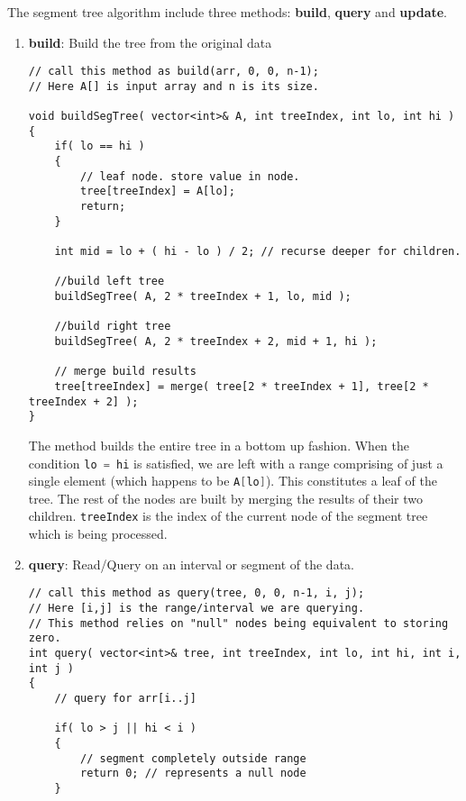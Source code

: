 The segment tree algorithm include three methods: \textbf{build}, \textbf{query} and \textbf{update}.

\begin{enumerate}
\item \textbf{build}: Build the tree from the original data
\setcounter{lstlisting}{0}
\begin{lstlisting}[style=customc, caption={Build}]
// call this method as build(arr, 0, 0, n-1);
// Here A[] is input array and n is its size.

void buildSegTree( vector<int>& A, int treeIndex, int lo, int hi )
{
    if( lo == hi )
    {
        // leaf node. store value in node.
        tree[treeIndex] = A[lo];
        return;
    }

    int mid = lo + ( hi - lo ) / 2; // recurse deeper for children.

    //build left tree
    buildSegTree( A, 2 * treeIndex + 1, lo, mid );

    //build right tree
    buildSegTree( A, 2 * treeIndex + 2, mid + 1, hi );

    // merge build results
    tree[treeIndex] = merge( tree[2 * treeIndex + 1], tree[2 * treeIndex + 2] );
}
\end{lstlisting}
The method builds the entire tree in a bottom up fashion. When the condition \lstinline[language=C++, basicstyle=\small\ttfamily, keywordstyle=\bfseries\color{green!40!black}]|lo = hi| is satisfied, we are left with a range comprising of just a single element (which happens to be \lstinline[language=C++, basicstyle=\small\ttfamily, keywordstyle=\bfseries\color{green!40!black}]|A[lo]|). This constitutes a leaf of the tree. The rest of the nodes are built by merging the results of their two children. \lstinline[language=C++, basicstyle=\small\ttfamily, keywordstyle=\bfseries\color{green!40!black}]|treeIndex| is the index of the current node of the segment tree which is being processed.
\item \textbf{query}: Read/Query on an interval or segment of the data.

\begin{lstlisting}[style=customc, caption={Query/Read}]
// call this method as query(tree, 0, 0, n-1, i, j);
// Here [i,j] is the range/interval we are querying.
// This method relies on "null" nodes being equivalent to storing zero.
int query( vector<int>& tree, int treeIndex, int lo, int hi, int i, int j )
{
    // query for arr[i..j]

    if( lo > j || hi < i )
    {
        // segment completely outside range
        return 0; // represents a null node
    }


\end{lstlisting}
\end{enumerate}
